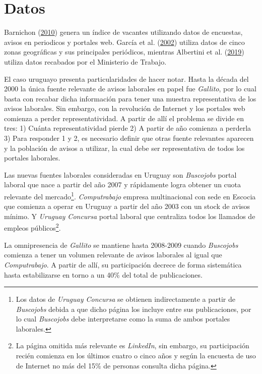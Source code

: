 \documentclass[12pt,oneside]{reedthesis}
\begin{document}
\hypertarget{Datos}{%
\chapter{Datos}\label{Datos}}

Barnichon (\protect\hyperlink{ref-Barnichon2010}{2010}) genera un índice de vacantes utilizando datos de encuestas, avisos en periodicos y portales web. García et al. (\protect\hyperlink{ref-BankChile2002}{2002}) utiliza datos de cinco zonas geográficas y sus principales periódicos, mientras Albertini et al. (\protect\hyperlink{ref-ArgentinaBC2019}{2019}) utiliza datos recabados por el Ministerio de Trabajo.

El caso uruguayo presenta particularidades de hacer notar. Hasta la década del 2000 la única fuente relevante de avisos laborales en papel fue \emph{Gallito}, por lo cual basta con recabar dicha información para tener una muestra representativa de los avisos laborales. Sin embargo, con la revolución de Internet y los portales web comienza a perder representatividad. A partir de allí el problema se divide en tres: 1) Cuánta representatividad pierde 2) A partir de año comienza a perderla 3) Para responder 1 y 2, es necesario definir que otras fuente relevantes aparecen y la población de avisos a utilizar, la cual debe ser representativa de todos los portales laborales.

Las nuevas fuentes laborales consideradas en Uruguay son \emph{Buscojobs} portal laboral que nace a partir del año 2007 y rápidamente logra obtener un cuota relevante del mercado\footnote{Los datos de \emph{Uruguay Concursa} se obtienen indirectamente a partir de \emph{Buscojobs} debida a que dicho página los incluye entre sus publicaciones, por lo cual \emph{Buscojobs} debe interpretarse como la suma de ambos portales laborales.}. \emph{Computrabajo} empresa multinacional con sede en Escocia que comienza a operar en Uruguay a partir del año 2003 con un stock de avisos mínimo. Y \emph{Uruguay Concursa} portal laboral que centraliza todos los llamados de empleos públicos\footnote{La página omitida más relevante es \emph{LinkedIn}, sin embargo, su participación recién comienza en los últimos cuatro o cinco años y según la encuesta de uso de Internet no más del 15\% de personas consulta dicha página.}.

La omnipresencia de \emph{Gallito} se mantiene hasta 2008-2009 cuando \emph{Buscojobs} comienza a tener un volumen relevante de avisos laborales al igual que \emph{Computrabajo}. A partir de allí, su participación decrece de forma sistemática hasta estabilizarse en torno a un 40\% del total de publicaciones.
\end{document}

